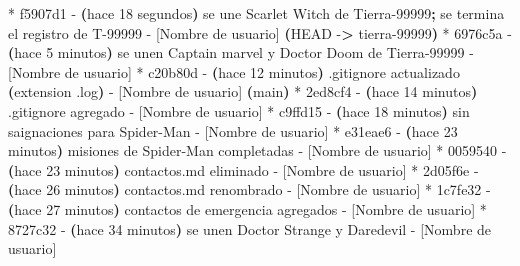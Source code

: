 \documentclass[
]{book}
\newenvironment{Shaded}{\begin{snugshade}}{\end{snugshade}}
\newcommand{\AttributeTok}[1]{\textcolor[rgb]{0.13,0.29,0.53}{#1}}
\newcommand{\ErrorTok}[1]{\textcolor[rgb]{0.64,0.00,0.00}{\textbf{#1}}}
\newcommand{\ExtensionTok}[1]{#1}
\newcommand{\KeywordTok}[1]{\textcolor[rgb]{0.13,0.29,0.53}{\textbf{#1}}}
\newcommand{\NormalTok}[1]{#1}
\newcommand{\OperatorTok}[1]{\textcolor[rgb]{0.81,0.36,0.00}{\textbf{#1}}}
\begin{document}
\begin{Shaded}
\begin{Highlighting}[]
\ExtensionTok{*}\NormalTok{ f5907d1 }\AttributeTok{{-}} \ErrorTok{(}\ExtensionTok{hace}\NormalTok{ 18 segundos}\KeywordTok{)} \ExtensionTok{se}\NormalTok{ une Scarlet Witch de Tierra{-}99999}\KeywordTok{;} \ExtensionTok{se}\NormalTok{ termina el registro de T{-}99999 }\AttributeTok{{-}}\NormalTok{ [Nombre de usuario] }\ErrorTok{(}\ExtensionTok{HEAD} \AttributeTok{{-}}\OperatorTok{\textgreater{}}\NormalTok{ tierra{-}99999}\KeywordTok{)}
\ExtensionTok{*}\NormalTok{ 6976c5a }\AttributeTok{{-}} \ErrorTok{(}\ExtensionTok{hace}\NormalTok{ 5 minutos}\KeywordTok{)} \ExtensionTok{se}\NormalTok{ unen Captain marvel y Doctor Doom de Tierra{-}99999 }\AttributeTok{{-}}\NormalTok{ [Nombre de usuario]}
\ExtensionTok{*}\NormalTok{ c20b80d }\AttributeTok{{-}} \ErrorTok{(}\ExtensionTok{hace}\NormalTok{ 12 minutos}\KeywordTok{)} \ExtensionTok{.gitignore}\NormalTok{ actualizado }\ErrorTok{(}\ExtensionTok{extension}\NormalTok{ .log}\KeywordTok{)} \ExtensionTok{{-}}\NormalTok{ [Nombre de usuario] }\ErrorTok{(}\ExtensionTok{main}\KeywordTok{)}
\ExtensionTok{*}\NormalTok{ 2ed8cf4 }\AttributeTok{{-}} \ErrorTok{(}\ExtensionTok{hace}\NormalTok{ 14 minutos}\KeywordTok{)} \ExtensionTok{.gitignore}\NormalTok{ agregado }\AttributeTok{{-}}\NormalTok{ [Nombre de usuario]}
\ExtensionTok{*}\NormalTok{ c9ffd15 }\AttributeTok{{-}} \ErrorTok{(}\ExtensionTok{hace}\NormalTok{ 18 minutos}\KeywordTok{)} \ExtensionTok{sin}\NormalTok{ saignaciones para Spider{-}Man }\AttributeTok{{-}}\NormalTok{ [Nombre de usuario]}
\ExtensionTok{*}\NormalTok{ e31eae6 }\AttributeTok{{-}} \ErrorTok{(}\ExtensionTok{hace}\NormalTok{ 23 minutos}\KeywordTok{)} \ExtensionTok{misiones}\NormalTok{ de Spider{-}Man completadas }\AttributeTok{{-}}\NormalTok{ [Nombre de usuario]}
\ExtensionTok{*}\NormalTok{ 0059540 }\AttributeTok{{-}} \ErrorTok{(}\ExtensionTok{hace}\NormalTok{ 23 minutos}\KeywordTok{)} \ExtensionTok{contactos.md}\NormalTok{ eliminado }\AttributeTok{{-}}\NormalTok{ [Nombre de usuario]}
\ExtensionTok{*}\NormalTok{ 2d05f6e }\AttributeTok{{-}} \ErrorTok{(}\ExtensionTok{hace}\NormalTok{ 26 minutos}\KeywordTok{)} \ExtensionTok{contactos.md}\NormalTok{ renombrado }\AttributeTok{{-}}\NormalTok{ [Nombre de usuario]}
\ExtensionTok{*}\NormalTok{ 1c7fe32 }\AttributeTok{{-}} \ErrorTok{(}\ExtensionTok{hace}\NormalTok{ 27 minutos}\KeywordTok{)} \ExtensionTok{contactos}\NormalTok{ de emergencia agregados }\AttributeTok{{-}}\NormalTok{ [Nombre de usuario]}
\ExtensionTok{*}\NormalTok{ 8727c32 }\AttributeTok{{-}} \ErrorTok{(}\ExtensionTok{hace}\NormalTok{ 34 minutos}\KeywordTok{)} \ExtensionTok{se}\NormalTok{ unen Doctor Strange y Daredevil }\AttributeTok{{-}}\NormalTok{ [Nombre de usuario]}

\end{Highlighting}
\end{Shaded}
\end{document}
